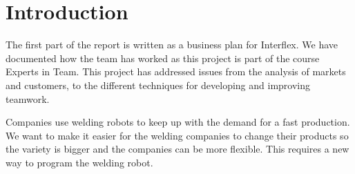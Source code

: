 \section{Introduction}

The first part of the report is written as a business plan for Interflex. 
We have documented how the team has worked as this project is part of the course Experts in Team.
This project has addressed issues from the analysis of markets and customers, to the different techniques for developing and improving teamwork.

Companies use welding robots to keep up with the demand for a fast production.
We want to make it easier for the welding companies to change their products so the variety is bigger and the companies can be more flexible.
This requires a new way to program the welding robot. 
